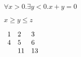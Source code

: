 \documentclass{article}
\begin{document}
    \vspace{5mm}

    $\forall x>0. \exists y<0. x+y = 0$

    \vspace{5mm}
    $x \geq y \leq z$

    \vspace{5mm}
    \begin{math}
        \begin{array}{l l l}
            1 & 2 & 3 \\
            4 & 5 & 6 \\
            & 11 & 13 \\
        \end{array}
    \end{math}
\end{document}
